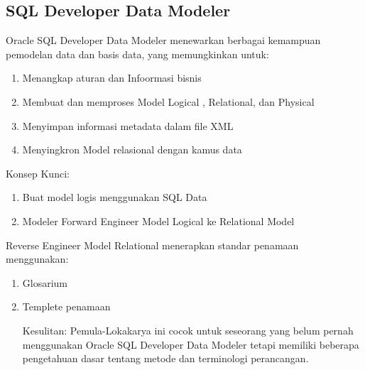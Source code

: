 \documentclass{article}
\begin{document}
\begin{itemize}
\section{SQL Developer Data Modeler }
\par
Oracle SQL Developer Data Modeler menewarkan berbagai kemampuan pemodelan data dan basis data, yang memungkinkan untuk:
\begin{enumerate}
    \item Menangkap  aturan dan Infoormasi bisnis
    \item Membuat dan memproses Model Logical , Relational, dan Physical
    \item Menyimpan informasi metadata dalam file XML
    \item Menyingkron Model relasional dengan kamus data
    \end{enumerate}
\par
Konsep Kunci:
\begin{enumerate}
    \item Buat model logis menggunakan SQL Data 
    \item Modeler Forward Engineer Model Logical ke Relational Model
    \end{enumerate}
\par
Reverse Engineer Model Relational menerapkan standar penamaan menggunakan:
\begin{enumerate}
    \item Glosarium
    \item Templete penamaan
\par
Kesulitan: Pemula-Lokakarya ini cocok untuk seseorang yang belum pernah menggunakan Oracle SQL Developer Data Modeler tetapi  memiliki beberapa pengetahuan dasar tentang metode dan terminologi perancangan.
\end{enumerate}
\end{itemize}
\end{document}

